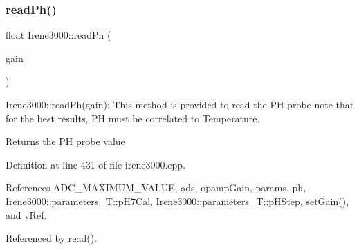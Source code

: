 \subsubsection{\texorpdfstring{read\+Ph()}{readPh()}}
{\footnotesize\ttfamily float Irene3000\+::read\+Ph (\begin{DoxyParamCaption}\item[{ads\+Gain\+\_\+t}]{gain }\end{DoxyParamCaption})}

Irene3000\+::read\+Ph(gain)\+: This method is provided to read the PH probe note that for the best results, PH must be correlated to Temperature.

\begin{DoxyReturn}{Returns}
the PH probe value 
\end{DoxyReturn}


Definition at line 431 of file irene3000.\+cpp.



References A\+D\+C\+\_\+\+M\+A\+X\+I\+M\+U\+M\+\_\+\+V\+A\+L\+UE, ads, opamp\+Gain, params, ph, Irene3000\+::parameters\+\_\+\+T\+::p\+H7\+Cal, Irene3000\+::parameters\+\_\+\+T\+::p\+H\+Step, set\+Gain(), and v\+Ref.



Referenced by read().


